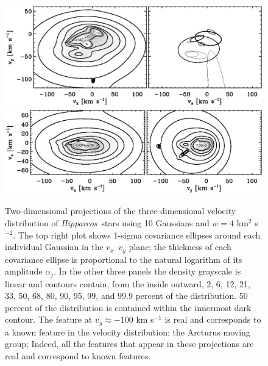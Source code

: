\documentclass[aoas,preprint,authoryear,round]{imsart}
\newcommand{\Hipparcos}{\emph{Hipparcos}}
\begin{document}

%



\clearpage
\begin{figure}
\centering
\includegraphics[width=\textwidth]{4veldist1.ps}\\%
\includegraphics[width=\textwidth]{4veldist2.ps}%
\caption{Two-dimensional projections of the three-dimensional velocity
distribution of \Hipparcos\ stars using 10 Gaussians and $w = 4$
km$^2$ s$^{-2}$. The top right plot shows 1-sigma covariance ellipses
around each individual Gaussian in the $v_x$--$v_y$ plane; the
thickness of each covariance ellipse is proportional to the natural
logarithm of its amplitude $\alpha_j$. In the other three panels the
density grayscale is linear and contours contain, from the inside
outward, 2, 6, 12, 21, 33, 50, 68, 80, 90, 95, 99, and 99.9 percent of
the distribution. 50 percent of the distribution is contained within
the innermost dark contour. The feature at $v_y \approx -100$ km
s$^{-1}$ is real and corresponds to a known feature in the velocity
distribution: the Arcturus moving group; Indeed, all the features that
appear in these projections are real and correspond to known
features.}\label{fig:4veldist}
\end{figure}
\end{document}
